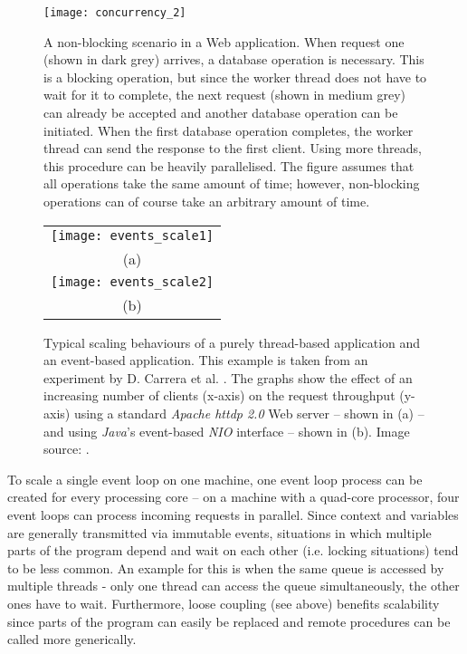 \begin{figure}
\centering\small
\setlength{\tabcolsep}{0mm}
  \texttt{[image: concurrency\_2]}
\caption{
A non-blocking scenario in a Web application. When request one (shown in dark grey) arrives, a database operation is necessary. This is a blocking operation, but since the worker thread does not have to wait for it to complete, the next request (shown in medium grey) can already be accepted and another database operation can be initiated. When the first database operation completes, the worker thread can send the response to the first client. Using more threads, this procedure can be heavily parallelised. The figure assumes that all operations take the same amount of time; however, non-blocking operations can of course take an arbitrary amount of time.
}
\label{fig:concurrency_2}
\end{figure}

\begin{figure}
\centering\small
\begin{tabular}{c@{\hspace{12mm}}}
  \texttt{[image: events\_scale1]} \\
  (a)
\\[14pt]
  \texttt{[image: events\_scale2]} \\
  (b)
\end{tabular}
\caption{Typical scaling behaviours of a purely thread-based application and an event-based application. This example is taken from an experiment by D. Carrera et al. \cite{Carrera}. The graphs show the effect of an increasing number of clients (x-axis) on the request throughput (y-axis) using a standard \textit{Apache httdp 2.0} Web server -- shown in (a) -- and using \textit{Java}'s event-based \textit{NIO} interface -- shown in (b). Image source: \cite{Carrera}.} 
\label{fig:events_scale}
\end{figure}
 
To scale a single event loop on one machine, one event loop process can be created for every processing core -- on a machine with a quad-core processor, four event loops can process incoming requests in parallel. Since context and variables are generally transmitted via immutable events, situations in which multiple parts of the program depend and wait on each other (i.e. locking situations) tend to be less common. An example for this is when the same queue is accessed by multiple threads - only one thread can access the queue simultaneously, the other ones have to wait. Furthermore, loose coupling (see above) benefits scalability since parts of the program can easily be replaced and remote procedures can be called more generically.

